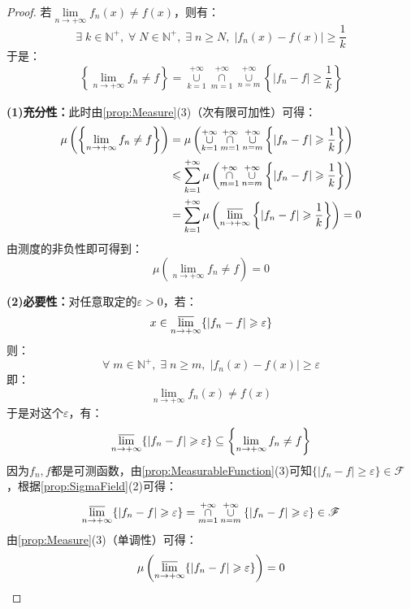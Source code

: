 \begin{proof}
	若$\lim\limits_{n\to+\infty}f_n(x)\ne f(x)$，则有：
	\begin{equation*}
		\exists\;k\in\mathbb{N}^+,\;\forall\;N\in\mathbb{N}^+,\;\exists\;n\geqslant N,\;|f_n(x)-f(x)|\geqslant\frac{1}{k}
	\end{equation*}
	于是：
	\begin{equation*}
		\left\{\lim_{n\to+\infty}f_n\ne f\right\}=\underset{k=1}{\overset{+\infty}{\cup}}\underset{m=1}{\overset{+\infty}{\cap}}\underset{n=m}{\overset{+\infty}{\cup}}\left\{|f_n-f|\geqslant\frac{1}{k}\right\}
	\end{equation*}\par
	\textbf{(1)充分性：}此时由\cref{prop:Measure}(3)（次有限可加性）可得：
	\begin{align*}
		\mu\left(\left\{\lim_{n\to+\infty}f_n\ne f\right\}\right)
		&=\mu\left(\underset{k=1}{\overset{+\infty}{\cup}}\underset{m=1}{\overset{+\infty}{\cap}}\underset{n=m}{\overset{+\infty}{\cup}}\left\{|f_n-f|\geqslant\frac{1}{k}\right\}\right) \\
		&\leqslant\sum_{k=1}^{+\infty}\mu\left(\underset{m=1}{\overset{+\infty}{\cap}}\underset{n=m}{\overset{+\infty}{\cup}}\left\{|f_n-f|\geqslant\frac{1}{k}\right\}\right) \\
		&=\sum_{k=1}^{+\infty}\mu\left(\varlimsup_{n\to+\infty}\left\{|f_n-f|\geqslant\frac{1}{k}\right\}\right)=0
	\end{align*}
	由测度的非负性即可得到：
	\begin{equation*}
		\mu\left(\lim_{n\to+\infty}f_n\ne f\right)=0
	\end{equation*}\par
	\textbf{(2)必要性：}对任意取定的$\varepsilon>0$，若：
	\begin{equation*}
		x\in\varlimsup_{n\to+\infty}\{|f_n-f|\geqslant\varepsilon\}
	\end{equation*}
	则：
	\begin{equation*}
		\forall\;m\in\mathbb{N}^+,\;\exists\;n\geqslant m,\;|f_n(x)-f(x)|\geqslant \varepsilon
	\end{equation*}
	即：
	\begin{equation*}
		\lim_{n\to+\infty}f_n(x)\ne f(x)
	\end{equation*}
	于是对这个$\varepsilon$，有：
	\begin{equation*}
		\varlimsup_{n\to+\infty}\{|f_n-f|\geqslant\varepsilon\}\subseteq\left\{\lim_{n\to+\infty}f_n\ne f\right\}
	\end{equation*}
	因为$f_n,f$都是可测函数，由\cref{prop:MeasurableFunction}(3)可知$\{|f_n-f|\geqslant\varepsilon\}\in\mathscr{F}$，根据\cref{prop:SigmaField}(2)可得：
	\begin{equation*}
		\varlimsup_{n\to+\infty}\{|f_n-f|\geqslant\varepsilon\}=\underset{m=1}{\overset{+\infty}{\cap}}\underset{n=m}{\overset{+\infty}{\cup}}\{|f_n-f|\geqslant\varepsilon\}\in\mathscr{F}
	\end{equation*}
	由\cref{prop:Measure}(3)（单调性）可得：
	\begin{equation*}
		\mu\left(\varlimsup_{n\to+\infty}\{|f_n-f|\geqslant\varepsilon\}\right)=0\qedhere
	\end{equation*}
\end{proof}
